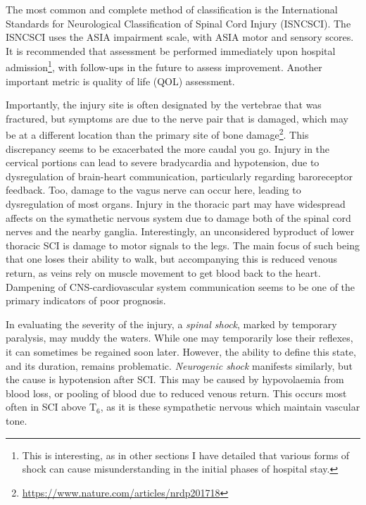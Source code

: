 The most common and complete method of classification is the International Standards for Neurological Classification of Spinal Cord Injury (ISNCSCI). The ISNCSCI uses the ASIA impairment scale, with ASIA motor and sensory scores. It is recommended that assessment be performed immediately upon hospital admission\footnote{This is interesting, as in other sections I have detailed that various forms of shock can cause misunderstanding in the initial phases of hospital stay.}, with follow-ups in the future to assess improvement. Another important metric is quality of life (QOL) assessment.\newline 

Importantly, the injury site is often designated by the vertebrae that was fractured, but symptoms are due to the nerve pair that is damaged, which may be at a different location than the primary site of bone damage\footnote{\url{https://www.nature.com/articles/nrdp201718}}. This discrepancy seems to be exacerbated the more caudal you go. Injury in the cervical portions can lead to severe bradycardia and hypotension, due to dysregulation of brain-heart communication, particularly regarding baroreceptor feedback. Too, damage to the vagus nerve can occur here, leading to dysregulation of most organs. Injury in the thoracic part may have widespread affects on the symathetic nervous system due to damage both of the spinal cord nerves and the nearby ganglia. Interestingly, an unconsidered byproduct of lower thoracic SCI is damage to motor signals to the legs. The main focus of such being that one loses their ability to walk, but accompanying this is reduced venous return, as veins rely on muscle movement to get blood back to the heart. Dampening of CNS-cardiovascular system communication seems to be one of the primary indicators of poor prognosis.\newline

In evaluating the severity of the injury, a \textit{spinal shock}, marked by temporary paralysis, may muddy the waters. While one may temporarily lose their reflexes, it can sometimes be regained soon later. However, the ability to define this state, and its duration, remains problematic. \textit{Neurogenic shock} manifests similarly, but the cause is hypotension after SCI. This may be caused by hypovolaemia from blood loss, or pooling of blood due to reduced venous return. This occurs most often in SCI above T$_6$, as it is these sympathetic nervous which maintain vascular tone.\newline

